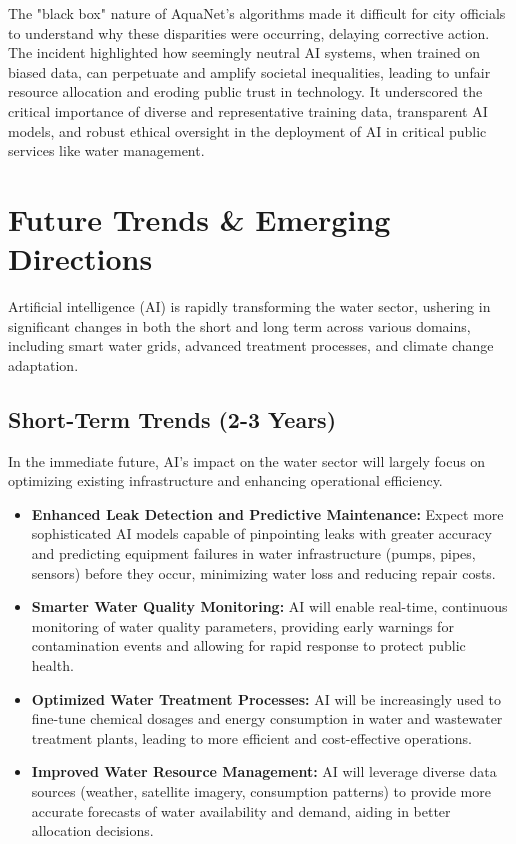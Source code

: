 The "black box" nature of AquaNet's algorithms made it difficult for city officials to understand why these disparities were occurring, delaying corrective action. The incident highlighted how seemingly neutral AI systems, when trained on biased data, can perpetuate and amplify societal inequalities, leading to unfair resource allocation and eroding public trust in technology. It underscored the critical importance of diverse and representative training data, transparent AI models, and robust ethical oversight in the deployment of AI in critical public services like water management.

\section{Future Trends \& Emerging Directions}

Artificial intelligence (AI) is rapidly transforming the water sector, ushering in significant changes in both the short and long term across various domains, including smart water grids, advanced treatment processes, and climate change adaptation.

\subsection{Short-Term Trends (2-3 Years)}
In the immediate future, AI's impact on the water sector will largely focus on optimizing existing infrastructure and enhancing operational efficiency.
\begin{itemize}
    \item \textbf{Enhanced Leak Detection and Predictive Maintenance:} Expect more sophisticated AI models capable of pinpointing leaks with greater accuracy and predicting equipment failures in water infrastructure (pumps, pipes, sensors) before they occur, minimizing water loss and reducing repair costs.
    \item \textbf{Smarter Water Quality Monitoring:} AI will enable real-time, continuous monitoring of water quality parameters, providing early warnings for contamination events and allowing for rapid response to protect public health.
    \item \textbf{Optimized Water Treatment Processes:} AI will be increasingly used to fine-tune chemical dosages and energy consumption in water and wastewater treatment plants, leading to more efficient and cost-effective operations.
    \item \textbf{Improved Water Resource Management:} AI will leverage diverse data sources (weather, satellite imagery, consumption patterns) to provide more accurate forecasts of water availability and demand, aiding in better allocation decisions.
\end{itemize}

